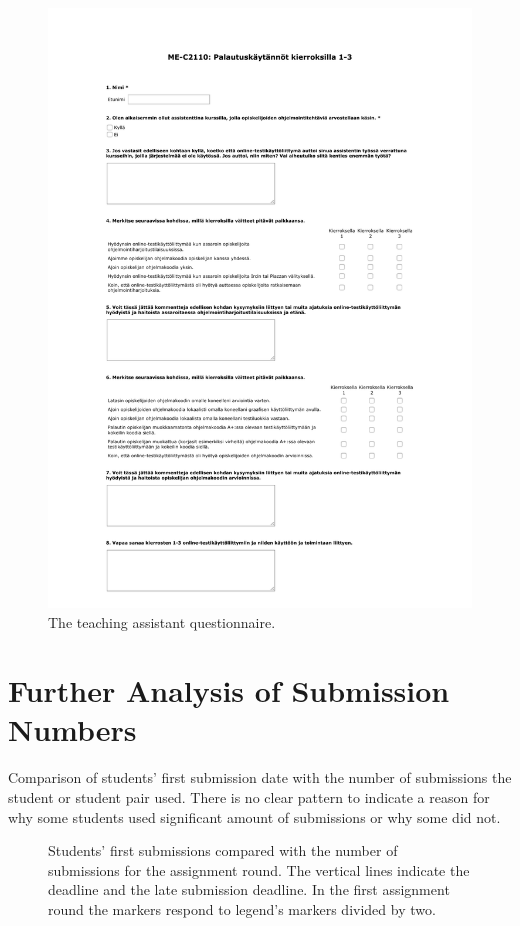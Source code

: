 \begin{figure}
\caption{The teaching assistant questionnaire.}
\label{fig:TAquestionnaire}
\includegraphics[page=1, width=\textwidth, height=\textheight]{images/kysely-assarit2.pdf}
\end{figure}



\chapter{Further Analysis of Submission Numbers}
\label{appendix:first-vs-number}

Comparison of students' first submission date with the number of submissions the student or student pair used. There is no clear pattern to indicate a reason for why some students used significant amount of submissions or why some did not.

\begin{figure}
	\begin{center}
		
	\end{center}
	\caption[asdf]{Students' first submissions compared with the number of submissions for the assignment
  							 round. The vertical lines indicate the deadline and the late submission
								 deadline. In the first assignment round the markers respond to legend's markers divided by two.}
	\label{figure:first-vs-number}
\end{figure}
